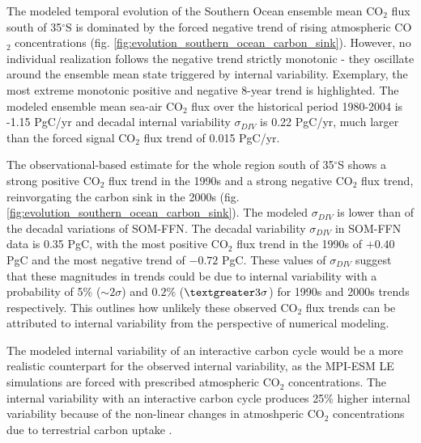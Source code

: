 The modeled temporal evolution of the Southern Ocean ensemble mean CO$_2$ flux south of 35$^\circ$S is dominated by the forced negative trend of rising atmospheric CO$_2$ concentrations (fig. \ref{fig:evolution_southern_ocean_carbon_sink}). However, no individual realization follows the negative trend strictly monotonic - they oscillate around the ensemble mean state triggered by internal variability. Exemplary, the most extreme monotonic positive and negative 8-year trend is highlighted. The modeled ensemble mean sea-air CO$_2$ flux over the historical period 1980-2004 is -1.15 PgC/yr and decadal internal variability $\sigma_{DIV}$ is 0.22 PgC/yr, much larger than the forced signal CO$_2$ flux trend of 0.015 PgC/yr.\newline



The observational-based estimate for the whole region south of 35$^\circ$S shows a strong positive CO$_2$ flux trend in the 1990s \citep{LeQuere2007} and a strong negative CO$_2$ flux trend, reinvorgating the carbon sink in the 2000s  \citep{landschuetzer2015} (fig. \ref{fig:evolution_southern_ocean_carbon_sink}). 
The modeled $\sigma_{DIV}$ is lower than of the decadal variations of \acs{SOM-FFN}. The decadal variability $\sigma_{DIV}$ in \acs{SOM-FFN} data is 0.35 PgC, with the most positive CO$_2$ flux trend in the 1990s of $+0.40$ PgC and the most negative trend  of $-0.72$ PgC. These values of $\sigma_{DIV}$ suggest that these magnitudes in trends could be due to internal variability with a probability of 5\% ($\sim2\sigma$) and $0.2$\% ($\textgreater3\sigma$) for 1990s and 2000s trends respectively. This outlines how unlikely these observed CO$_2$ flux trends can be attributed to internal variability from the perspective of numerical modeling.   

The modeled internal variability of an interactive carbon cycle would be a more realistic counterpart for the observed internal variability, as the \acs{MPI-ESM LE} simulations are forced with prescribed atmospheric CO$_2$ concentrations. The internal variability with an interactive carbon cycle produces 25\% higher internal variability because of the non-linear changes in atmoshperic CO$_2$ concentrations due to terrestrial carbon uptake \citep{Ilyina2013}.\newline


